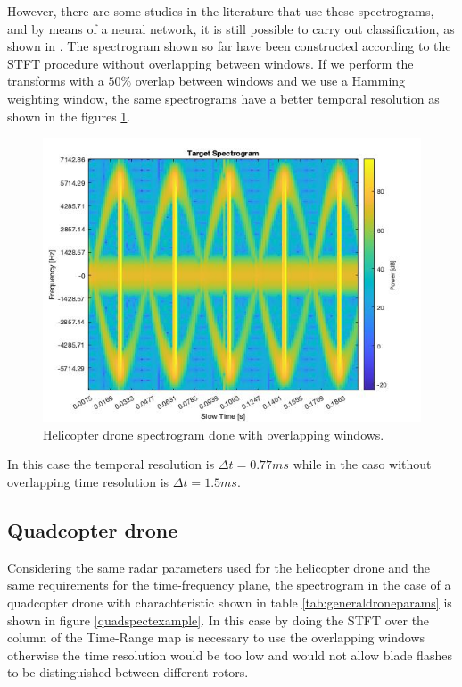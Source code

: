 However, there are some studies in the literature that use these spectrograms, and by means of a neural network, it is still possible to carry out classification, as shown in \cite{MartinMulgrew}. The spectrogram shown so far have been constructed according to the STFT procedure without overlapping between windows. If we perform the transforms with a $50\%$ overlap between windows and we use a Hamming weighting window, the same spectrograms have a better temporal resolution as shown in the figures \ref{helicspectwithoverlap}.

\begin{figure}[h!]
\centering
\includegraphics[width=12cm]{FMCW mD analysis-chap4/img/spect_helic_with_overlap.jpg}
\caption{Helicopter drone spectrogram done with overlapping windows.}
\label{helicspectwithoverlap}
\end{figure}

 In this case the temporal resolution is $\Delta t = 0.77 ms$ while in the caso without overlapping time resolution is $\Delta t = 1.5 ms$.
 
\subsection{Quadcopter drone}
Considering the same radar parameters used for the helicopter drone and the same requirements for the time-frequency plane, the spectrogram in the case of a quadcopter drone with charachteristic shown in table \ref{tab:generaldroneparams} is shown in figure \ref{quadspectexample}. In this case by doing the STFT over the column of the Time-Range map is necessary to use the overlapping windows otherwise the time resolution would be too low and would not allow blade flashes to be distinguished between different rotors. 

